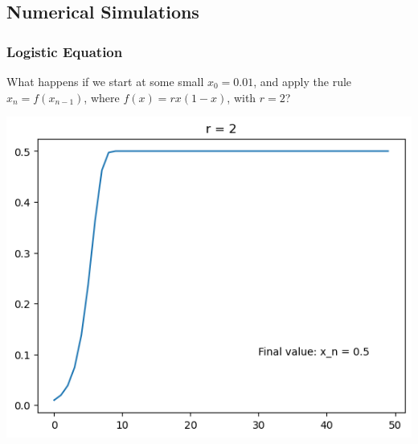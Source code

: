 \documentclass[9pt]{beamer}
\begin{document}
\subsection{Numerical Simulations}
\begin{frame}
	\frametitle{Logistic Equation} 

	What happens if we start at some small \( x_0 = 0.01 \), and 
	apply the rule \( x_n = f(x_{n - 1}) \), where 
	\( f(x) = rx(1 - x) \), with \( r = 2 \)? 

	\pause
	\begin{center}
		\includegraphics[scale=0.4]{r=2.png}
	\end{center}

\end{frame}	
\end{document}

